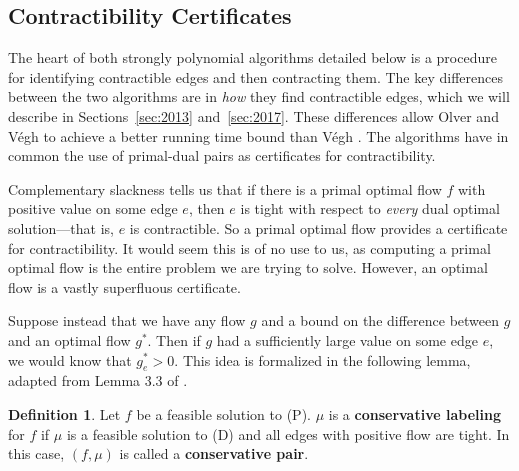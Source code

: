 \documentclass[11pt]{article}
\theoremstyle{definition}
\newtheorem{definition}{Definition}[section]
\theoremstyle{definition}
\theoremstyle{definition}
\begin{document}
	
	
	\subsection{Contractibility Certificates} \label{sec:cert-contract}
	The heart of both strongly polynomial algorithms detailed below is a procedure for
	identifying contractible edges and then contracting them.
	The key differences between the two algorithms are in 
	\textit{how} they find contractible edges, which
	we will describe in Sections~\ref{sec:2013} and~\ref{sec:2017}. These differences
	allow Olver and Végh \cite{Olver2017} to achieve a better running time bound than
	Végh \cite{Vegh2013}. The algorithms have in common the use of primal-dual pairs
	as certificates for contractibility.

	Complementary slackness tells us that if there is a primal optimal flow
	$f$ with positive value
	on some edge $e$, then $e$ is tight with respect to \emph{every} dual
	optimal solution---that
	is, $e$ is contractible. So a primal optimal flow provides a certificate
	for contractibility.
	It would seem this is of no use to us, as computing a primal optimal flow is the entire
	problem we are trying to solve. However,
	an optimal flow is a vastly superfluous certificate.
	
	Suppose instead that we have any flow $g$ and a bound on the difference
	between $g$ and an optimal
	flow $g^*$. Then if $g$ had a sufficiently large value on some edge $e$, we would know that
	$g^*_e > 0$. This idea is formalized in the following lemma, adapted from Lemma 3.3 of
	\cite{Olver2017}.
	
  	\begin{definition} \label{def:conservative}
  	Let $f$ be a feasible solution to (P).
	$\mu$ is a \textbf{conservative labeling} for $f$ if $\mu$ is
	a feasible solution to (D) and all edges with positive flow are tight. In this case,
	$(f, \mu)$ is called a \textbf{conservative pair}.
	\end{definition}
\end{document}
